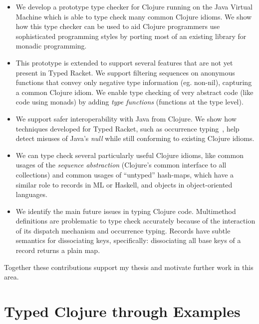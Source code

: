 \begin{itemize}
  \item We develop a prototype type checker for Clojure running on the Java Virtual Machine
        which is able to type check many common Clojure idioms.
        We show how this type checker can be used to aid Clojure programmers use sophisticated
        programming styles by porting most of an existing library for monadic programming.

  \item This prototype is extended to support several features that are not yet present in Typed Racket.
        We support filtering sequences on anonymous functions that convey only negative type information
        (eg. non-nil), capturing a common Clojure idiom.
        We enable type checking of very abstract code (like code using monads)
        by adding \emph{type functions} (functions at the type level).

  \item We support safer interoperability with Java from Clojure. We show how techniques developed for
        Typed Racket, such as occurrence typing~\cite{TF10}, help detect misuses of Java's \emph{null}
        while still conforming to existing Clojure idioms.

  \item We can type check several particularly useful Clojure idioms, like common usages of the \emph{sequence abstraction}
        (Clojure's common interface to all collections) and 
        common usages of ``untyped'' hash-maps, which have a similar role to records in ML or Haskell,
        and objects in object-oriented languages.

  \item We identify the main future issues in typing Clojure code. Multimethod definitions are problematic
        to type check accurately because of the interaction of its dispatch mechanism and occurrence typing.
        Records have subtle semantics for dissociating keys, specifically: dissociating all base keys of a record returns
        a plain map.
\end{itemize}

Together these contributions support my thesis and motivate further work in this area.

\section{Typed Clojure through Examples}

